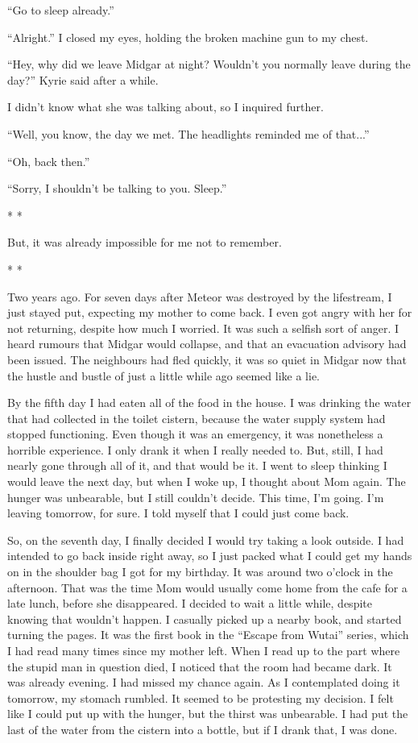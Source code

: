 \documentclass[oneside]{book}
\begin{document}
“Go to sleep already.”

“Alright.” I closed my eyes, holding the broken machine gun to my chest.

“Hey, why did we leave Midgar at night? Wouldn’t you normally leave during the day?” Kyrie said after a while.

I didn’t know what she was talking about, so I inquired further.

“Well, you know, the day we met. The headlights reminded me of that...”

“Oh, back then.”

“Sorry, I shouldn’t be talking to you. Sleep.”

* *

But, it was already impossible for me not to remember.

* *

Two years ago. For seven days after Meteor was destroyed by the lifestream, I just stayed put, expecting my mother to come back. I even got angry with her for not returning, despite how much I worried. It was such a selfish sort of anger. I heard rumours that Midgar would collapse, and that an evacuation advisory had been issued. The neighbours had fled quickly, it was so quiet in Midgar now that the hustle and bustle of just a little while ago seemed like a lie.

By the fifth day I had eaten all of the food in the house. I was drinking the water that had collected in the toilet cistern, because the water supply system had stopped functioning. Even though it was an emergency, it was nonetheless a horrible experience. I only drank it when I really needed to. But, still, I had nearly gone through all of it, and that would be it. I went to sleep thinking I would leave the next day, but when I woke up, I thought about Mom again. The hunger was unbearable, but I still couldn’t decide. This time, I’m going. I’m leaving tomorrow, for sure. I told myself that I could just come back.

So, on the seventh day, I finally decided I would try taking a look outside. I had intended to go back inside right away, so I just packed what I could get my hands on in the shoulder bag I got for my birthday. It was around two o’clock in the afternoon. That was the time Mom would usually come home from the cafe for a late lunch, before she disappeared. I decided to wait a little while, despite knowing that wouldn’t happen. I casually picked up a nearby book, and started turning the pages. It was the first book in the “Escape from Wutai” series, which I had read many times since my mother left. When I read up to the part where the stupid man in question died, I noticed that the room had became dark. It was already evening. I had missed my chance again. As I contemplated doing it tomorrow, my stomach rumbled. It seemed to be protesting my decision. I felt like I could put up with the hunger, but the thirst was unbearable. I had put the last of the water from the cistern into a bottle, but if I drank that, I was done.
\end{document}

